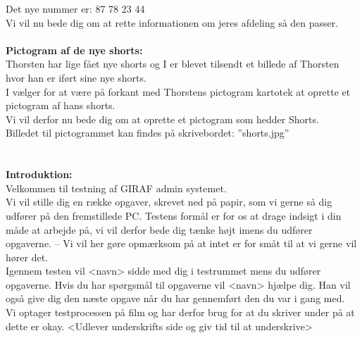 Det nye nummer er: 87 78 23 44\\
Vi vil nu bede dig om at rette informationen om jeres afdeling så den passer.\\
\\
\textbf{Pictogram af de nye shorts:}\\
Thorsten har lige fået nye shorts og I er blevet tilsendt et billede af Thorsten hvor han er iført sine nye shorts.\\
I vælger for at være på forkant med Thorstens pictogram kartotek at oprette et pictogram af hans shorts.\\
Vi vil derfor nu bede dig om at oprette et pictogram som hedder Shorts.\\
Billedet til pictogrammet kan findes på skrivebordet: ''shorts.jpg''\\
\\
\\
\textbf{Introduktion:}\\
Velkommen til testning af GIRAF admin systemet.\\
Vi vil stille dig en række opgaver, skrevet ned på papir, som vi gerne så dig udfører på den fremstillede PC. Testens formål er for os at drage indsigt i din måde at arbejde på, vi vil derfor bede dig tænke højt imens du udfører opgaverne. – Vi vil her gøre opmærksom på at intet er for småt til at vi gerne vil hører det.\\
Igennem testen vil <navn> sidde med dig i testrummet mens du udfører opgaverne. Hvis du har spørgsmål til opgaverne vil <navn> hjælpe dig. Han vil også give dig den næste opgave når du har gennemført den du var i gang med.\\
Vi optager testprocessen på film og har derfor brug for at du skriver under på at dette er okay. <Udlever underskrifts side og giv tid til at underskrive>
